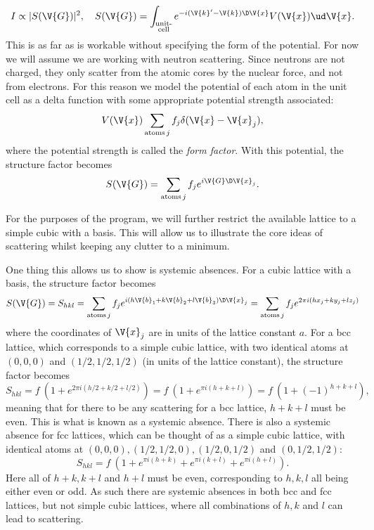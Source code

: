 \documentclass[main.tex]{subfiles}
\begin{document}
	\begin{equation}
		I \propto |S(\V{G})|^2, \quad S(\V{G}) = \int_{\substack{\text{unit-} \\\text{cell}}} e^{-i (\V{k}'-\V{k}) \D \V{x}} V(\V{x}) \ud \V{x}.
	\end{equation}
	This is as far as is workable without specifying the form of the potential. For now we will assume we are working with neutron scattering. Since neutrons are not charged, they only scatter from the atomic cores by the nuclear force, and not from electrons. For this reason we model the potential of each atom in the unit cell as a delta function with some appropriate potential strength associated:
	\begin{equation}\label{eq:Scat_neutron_pot}
		V(\V{x}) \sum_{\text{atoms} \,j} f_j \delta(\V{x}-\V{x}_j),
	\end{equation}
	where the potential strength is called the \textit{form factor}. With this potential, the structure factor becomes
	\begin{equation}\label{eq:Scat_struct}
		S(\V{G}) = \sum_{\text{atoms} \,j} f_j e^{i \V{G} \D \V{x}_j}.
	\end{equation}
	
	For the purposes of the program, we will further restrict the available lattice to a simple cubic with a basis. This will allow us to illustrate the core ideas of scattering whilst keeping any clutter to a minimum.
	
	One thing this allows us to show is systemic absences. For a cubic lattice with a basis, the structure factor becomes
	\begin{equation}\label{eq:Scat_struct_ortho}
		S(\V{G}) = S_{hkl} = \sum_{\text{atoms}\, j} f_j e^{i (h\V{b}_1 + k\V{b}_2 + l\V{b}_3) \D \V{x}_j} = \sum_{\text{atoms}\, j} f_j e^{2\pi i (hx_j + ky_j + lz_j)}
	\end{equation}
	where the coordinates of $ \V{x}_j $ are in units of the lattice constant $ a $. For a bcc lattice, which corresponds to a simple cubic lattice, with two identical atoms at $ (0,0,0) $ and $ (1/2, 1/2, 1/2) $ (in units of the lattice constant), the structure factor becomes
	\begin{equation}
		S_{hkl} = f\ (1 + e^{2\pi i (h/2 + k/2 + l/2)}) = f\ (1 + e^{\pi i (h+k+l)}) = f \ (1+ (-1)^{h+k+l}),
	\end{equation}
	meaning that for there to be any scattering for a bcc lattice, $ h+k+l $ must be even. This is what is known as a systemic absence. There is also a systemic absence for fcc lattices, which can be thought of as a simple cubic lattice, with identical atoms at $ (0,0,0), (1/2, 1/2, 0), (1/2, 0, 1/2) $ and $ (0, 1/2, 1/2) $:
	\begin{equation}
		S_{hkl} = f\ (1 + e^{\pi i (h+k)} + e^{\pi i (k+l)} + e^{\pi i (h+l)}).
	\end{equation}
	Here all of $ h+k, k+l $ and $ h+l $ must be even, corresponding to $ h,k,l $ all being either even or odd. As such there are systemic absences in both bcc and fcc lattices, but not simple cubic lattices, where all combinations of $ h,k $ and $ l $ can lead to scattering.
	
\end{document}
